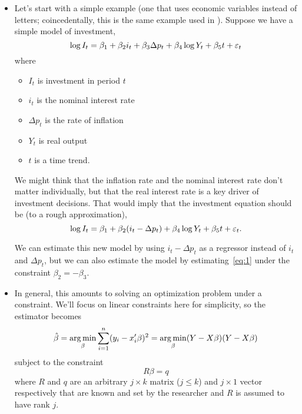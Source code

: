 \begin{itemize}

\item Let's start with a simple example (one that uses economic
  variables instead of letters; coincedentally, this is the same
  example used in \citealp[p. 81]{Gre12}).  Suppose we have a simple
  model of investment,
  \begin{equation}\label{eq:1}
    \log I_t = \beta_1 + \beta_2 i_t + \beta_3 \Delta p_t + \beta_4 \log Y_t + \beta_5 t + \vep_t
  \end{equation}
  where
  \begin{itemize}
  \item $I_t$ is investment in period $t$
  \item $i_t$ is the nominal interest rate
  \item $\Delta p_t$ is the rate of inflation
  \item $Y_t$ is real output
  \item $t$ is a time trend.
  \end{itemize}
  We might think that the inflation rate and the nominal interest rate
  don't matter individually, but that the real interest rate is a key
  driver of investment decisions.  That would imply that the
  investment equation should be (to a rough approximation),
  \begin{equation}\label{f2}
    \log I_t = \beta_1 + \beta_2 (i_t - \Delta p_t) + \beta_4 \log Y_t + \beta_5 t + \vep_t.
  \end{equation}
  
  We can estimate this new model by using $i_t - \Delta p_t$ as a regressor
  instead of $i_t$ and $\Delta p_t$, but we can also estimate the model by
  estimating~\eqref{eq:1} under the constraint $\beta_2 = - \beta_3$.

\item In general, this amounts to solving an optimization problem
  under a constraint.  We'll focus on linear constraints here for
  simplicity, so the estimator becomes
  \begin{equation}\label{f4}
    \betah = \argmin_\beta \sum_{i=1}^n (y_i - x_i'\beta)^2 = \argmin_\beta (Y - X\beta)(Y-X\beta)
  \end{equation}
  subject to the constraint
  \begin{equation}\label{f5}
    R \beta = q
  \end{equation}
  where $R$ and $q$ are an arbitrary $j \times k$ matrix ($j \leq k$) and $j \times
  1$ vector respectively that are known and set by the researcher and
  $R$ is assumed to have rank $j$.


\end{itemize}

